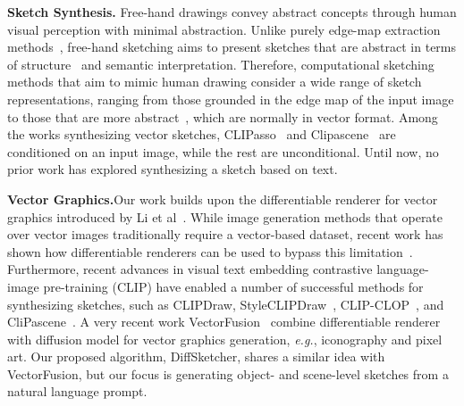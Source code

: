 \documentclass{article}
\begin{document}
\noindent\textbf{Sketch Synthesis.}\quad
Free-hand drawings convey abstract concepts through human visual perception with minimal abstraction. Unlike purely edge-map extraction methods~\cite{canny_1986}, free-hand sketching aims to present sketches that are abstract in terms of structure~\cite{infodrawing_Chan_2022} and semantic interpretation\cite{vinker_2022_clipasso}. Therefore, computational sketching methods that aim to mimic human drawing consider a wide range of sketch representations, ranging from those grounded in the edge map of the input image\cite{xie_2015_holistically,free_li_2017, li2019photo, grayscale_tong_2021,liu2020unsupervised,deepfacedrawing_chen_2020} to those that are more abstract~\cite{sketchRNN_ha_2018a,creative_ge_2021,doodleformer_bhunia_2022, clipdraw_frans_2022, SketchLattice_Qi_2021,vinker_2022_clipasso}, which are normally in vector format. Among the works synthesizing vector sketches, CLIPasso~\cite{vinker_2022_clipasso} and Clipascene~\cite{clipascene_vinker_2022} are conditioned on an input image, while the rest are unconditional. Until now, no prior work has explored synthesizing a sketch based on text. 

\noindent\textbf{Vector Graphics.}\quad Our work builds upon the differentiable renderer for vector graphics introduced by Li et al~\cite{Li_2020_diffvg}. While image generation methods that operate over vector images traditionally require a vector-based dataset, recent work has shown how differentiable renderers can be used to bypass this limitation~\cite{clipgen_shen_2021,rethinking_kotovenko_2021, evolution_tian_2022, im2vec_reddy_2021, Ma_2022_LIVE}. Furthermore, recent advances in visual text embedding contrastive language-image pre-training (CLIP)\cite{clip_radford_2021} have enabled a number of successful methods for synthesizing sketches, such as CLIPDraw\cite{clipdraw_frans_2022}, StyleCLIPDraw~\cite{Styleclipdraw_schaldenbr_2021}, CLIP-CLOP~\cite{clipclop_mirowski_2022}, and CliPascene~\cite{clipascene_vinker_2022}. A very recent work VectorFusion~\cite{jain2022vectorfusion} combine differentiable renderer with diffusion model for vector graphics generation, \textit{e.g.}, iconography and pixel art. Our proposed algorithm, DiffSketcher, shares a similar idea with VectorFusion, but our focus is generating object- and scene-level sketches from a natural language prompt.
\end{document}
